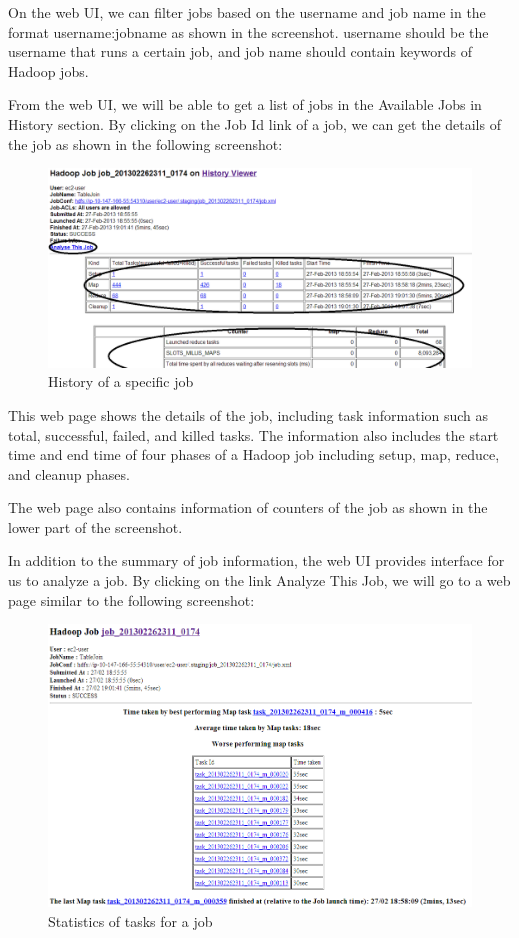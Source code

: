 On the web UI, we can filter jobs based on the username and job name in the format username:jobname as shown in the screenshot. username should be the username that runs a certain job, and job name should contain keywords of Hadoop jobs.

From the web UI, we will be able to get a list of jobs in the Available Jobs in History section. By clicking on the Job Id link of a job, we can get the details of the job as shown in the following screenshot:
\begin{figure}[h]
  \centering
  \includegraphics[width=\textwidth]{figs/5163os_04_02.png}
  \caption{History of a specific job}\label{fig:specific.job.history}
\end{figure} 

This web page shows the details of the job, including task information such as total, successful, failed, and killed tasks. The information also includes the start time and end time of four phases of a Hadoop job including setup, map, reduce, and cleanup phases.

The web page also contains information of counters of the job as shown in the lower part of the screenshot.

In addition to the summary of job information, the web UI provides interface for us to analyze a job. By clicking on the link Analyze This Job, we will go to a web page similar to the following screenshot:
\begin{figure}[h]
  \centering
  \includegraphics[width=\textwidth]{figs/5163os_04_03.png}
  \caption{Statistics of tasks for a job}\label{fig:task.statistics}
\end{figure} 

